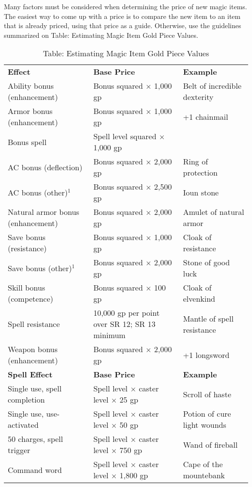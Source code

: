				
Many factors must be considered when determining the price of new magic items. The easiest way to come up with a price is to compare the new item to an item that is already priced, using that price as a guide. Otherwise, use the guidelines summarized on Table: Estimating Magic Item Gold Piece Values.
\begin{table*}[]
\sffamily
\caption{Table: Estimating Magic Item Gold Piece Values}
\begin{tabular}{lll}
\textbf{Effect} & \textbf{Base Price} & \textbf{Example}\\
Ability bonus (enhancement) & Bonus squared $\times$ 1,000 gp & Belt of incredible dexterity \\
 Armor bonus (enhancement) & Bonus squared $\times$ 1,000 gp & +1 chainmail \\
 Bonus spell & Spell level squared $\times$ 1,000 gp &   \\
 AC bonus (deflection) & Bonus squared $\times$ 2,000 gp & Ring of protection \\
 AC bonus (other)\(^{1}\) & Bonus squared $\times$ 2,500 gp & Ioun stone \\
 Natural armor bonus (enhancement) & Bonus squared $\times$ 2,000 gp & Amulet of natural armor \\
 Save bonus (resistance) & Bonus squared $\times$ 1,000 gp & Cloak of resistance \\
 Save bonus (other)\(^{1}\) & Bonus squared $\times$ 2,000 gp & Stone of good luck \\
 Skill bonus (competence) & Bonus squared $\times$ 100 gp & Cloak of elvenkind \\
 Spell resistance & 10,000 gp per point over SR 12; SR 13 minimum & Mantle of spell resistance \\
 Weapon bonus (enhancement) & Bonus squared $\times$ 2,000 gp & +1 longsword\\
\textbf{Spell Effect} &  \textbf{Base Price} & \textbf{Example}\\
Single use, spell completion & Spell level $\times$ caster level $\times$ 25 gp & Scroll of haste \\
 Single use, use-activated & Spell level $\times$ caster level $\times$ 50 gp & Potion of cure light wounds \\
 50 charges, spell trigger & Spell level $\times$ caster level $\times$ 750 gp & Wand of fireball \\
 Command word              & Spell level $\times$ caster level $\times$ 1,800 gp & Cape of the mountebank \\

\end{tabular}
\end{table*}
